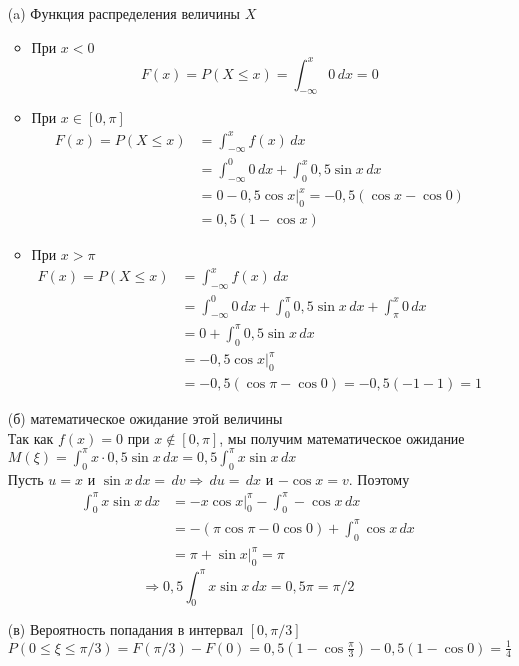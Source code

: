 \begin{exercise}[7]
	\begin{enumerate}
		\item [(a)] Функция распределения величины $X$
		\begin{itemize}
			\item При $x < 0$
			$$F(x) = P(X \leq x) = \int_{-\infty}^{x}0\,dx = 0$$
			\item При $x \in [0,\pi]$
			\begin{align*}
				F(x) = P(X \leq x) & = \int_{-\infty}^{x}f(x)\,dx \\ & = \int_{-\infty}^{0}0\,dx + \int_{0}^{x}0,5\sin x\,dx \\ & = 0 - 0,5\cos x\Big|^x_0 = -0,5(\cos x-\cos 0) \\ & = 0,5(1-\cos x)
			\end{align*}
			\item При $x > \pi$
			\begin{align*}
				F(x) = P(X \leq x) & = \int_{-\infty}^{x}f(x) \,dx \\ & = \int_{-\infty}^{0}0\,dx + \int_{0}^{\pi}0,5\sin x\,dx + \int_{\pi}^{x}0\,dx \\ & = 0 + \int_{0}^{\pi}0,5\sin x\,dx \\ & = -0,5 \cos x \Big|^{\pi}_0 \\ & = -0,5(\cos \pi - \cos 0) = -0,5 (-1 - 1) = 1
			\end{align*}
		\end{itemize}
		\item [(б)] математическое ожидание этой величины \\ Так как $f(x) = 0$ при $x \not\in [0, \pi]$, мы получим математическое ожидание $M(\xi) = \int_{0}^{\pi}x \cdot 0,5\sin x\,dx = 0,5 \int_{0}^{\pi} x \sin x\,dx$ \\  Пусть $u = x$ и $\sin x \,dx = \,dv \Rightarrow \,du = \,dx$ и $-\cos x = v$. Поэтому
		\begin{align*}
			\int_{0}^{\pi} x \sin x\,dx & = -x \cos x \Big|^{\pi}_{0} - \int_{0}^{\pi} -\cos x \,dx \\ & = -(\pi \cos \pi - 0 \cos 0) + \int_{0}^{\pi}\cos x\,dx \\ & = \pi + \sin x \Big|^{\pi}_{0} = \pi
		\end{align*}
		$$\Rightarrow 0,5 \int_{0}^{\pi}x \sin x\,dx = 0,5 \pi = \pi/2$$
	\item [(в)] Вероятность попадания в интервал $[0, \pi/3]$ \\ $P(0 \leq \xi \leq \pi/3) = F(\pi/3) - F(0) = 0,5(1-\cos \frac{\pi}{3}) - 0,5(1-\cos 0) = \frac{1}{4}$
	\end{enumerate}
\end{exercise}

